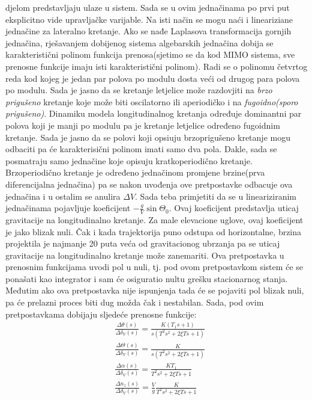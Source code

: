 djelom predstavljaju ulaze u sistem. Sada se u ovim jednačinama po prvi put eksplicitno vide upravljačke varijable.  
Na isti način se mogu naći i lineariziane jednačine za lateralno kretanje.
Ako se nađe Laplasova transformacija gornjih jednačina, rješavanjem dobijenog sistema algebarskih jednačina 
dobija se karakteristični polinom funkcija prenosa(sjetimo se da kod MIMO sistema, sve prenosne funkcije imaju isti karakteristični polinom). 
Radi se o polinomu četvrtog reda kod kojeg je jedan par polova po modulu dosta veći od drugog para polova po modulu. 
Sada je jasno da se kretanje letjelice može razdovjiti na \textit{brzo prigušeno} kretanje koje može biti oscilatorno 
ili aperiodičko i na \textit{fugoidno(sporo prigušeno)}. Dinamiku modela longitudinalnog kretanja određuje 
dominantni par polova koji je manji po modulu pa je kretanje letjelice određeno fugoidnim kretanje. Sada je jasno da se 
polovi koji opsiuju brzoprigušeno kretanje mogu odbaciti pa će karakterisični polinom imati samo dva pola. 
Dakle, sada se posmatraju samo jednačine koje opisuju kratkoperiodično kretanje. Brzoperiodično kretanje je 
određeno jednačinom promjene brzine(prva diferencijalna jednačina) pa se nakon uvođenja ove pretpostavke odbacuje ova 
jednačina  i u ostalim se anulira $\Delta V$. Sada teba primjetiti da se u lineariziranim jednačinama pojavljuje koeficijent 
$-\frac{g}{V}\sin\Theta_0$. Ovaj koeficijent predstavlja uticaj gravitacije na longitudinalno kretanje. Za male elevacione 
uglove, ovaj koeficijent je jako blizak nuli. Čak i kada trajektorija puno odstupa od horizontalne, brzina projektila 
je najmanje 20 puta veća od gravitacionog ubrzanja pa se uticaj gravitacije na longitudinalno kretanje može zanemariti. 
Ova pretpostavka u prenosnim funkcijama uvodi pol u nuli, tj. pod ovom pretpostavkom sistem će se ponašati kao integrator i 
sam će osiguratio nultu grešku stacionarnog stanja. Međutim ako ova pretpostavka nije ispunjenja tada će se pojaviti pol blizak nuli, 
pa će prelazni proces biti dug možda čak i nestabilan. Sada, pod ovim pretpostavkama dobijaju sljedeće prenosne funkcije:
\begin{align}
    &\frac{\Delta \theta(s)}{\Delta \delta_V(s)}=\frac{K(T_1s+1)}{s(T^2s^2+2\xi Ts+1)}\\
    &\frac{\Delta \Theta(s)}{\Delta \delta_V(s)}=\frac{K}{s(T^2s^2+2\xi Ts+1)}\\
    &\frac{\Delta \alpha(s)}{\Delta \delta_V(s)}=\frac{KT_1}{T^2s^2+2\xi Ts+1}\\
    &\frac{\Delta n_z(s)}{\Delta \delta_V(s)}=\frac{V}{g}\frac{K}{T^2s^2+2\xi Ts+1}
\end{align}
